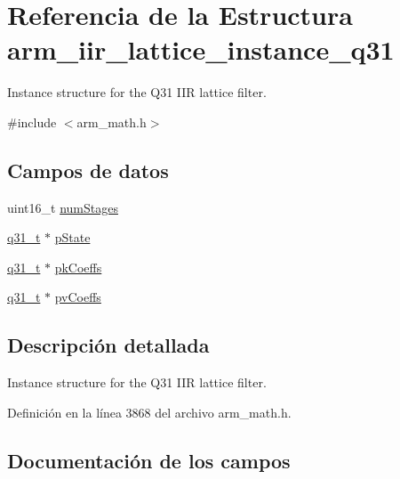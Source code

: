 \hypertarget{structarm__iir__lattice__instance__q31}{}\section{Referencia de la Estructura arm\+\_\+iir\+\_\+lattice\+\_\+instance\+\_\+q31}
\label{structarm__iir__lattice__instance__q31}


Instance structure for the Q31 I\+IR lattice filter.  




{\ttfamily \#include $<$arm\+\_\+math.\+h$>$}

\subsection*{Campos de datos}
\begin{DoxyCompactItemize}
\item 
uint16\+\_\+t \hyperlink{structarm__iir__lattice__instance__q31_a4cceb90547b3e585d4c7aabaa8057212}{num\+Stages}
\item 
\hyperlink{arm__math_8h_adc89a3547f5324b7b3b95adec3806bc0}{q31\+\_\+t} $\ast$ \hyperlink{structarm__iir__lattice__instance__q31_adee4ba3ee8869865af7d8fa08ca913d6}{p\+State}
\item 
\hyperlink{arm__math_8h_adc89a3547f5324b7b3b95adec3806bc0}{q31\+\_\+t} $\ast$ \hyperlink{structarm__iir__lattice__instance__q31_a9d45339bf841bf86aec57be5f70d2b01}{pk\+Coeffs}
\item 
\hyperlink{arm__math_8h_adc89a3547f5324b7b3b95adec3806bc0}{q31\+\_\+t} $\ast$ \hyperlink{structarm__iir__lattice__instance__q31_a3d7de56fe9de3458f033a64f14407533}{pv\+Coeffs}
\end{DoxyCompactItemize}


\subsection{Descripción detallada}
Instance structure for the Q31 I\+IR lattice filter. 

Definición en la línea 3868 del archivo arm\+\_\+math.\+h.



\subsection{Documentación de los campos}
